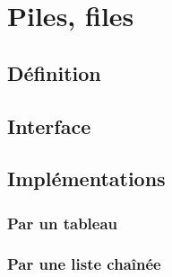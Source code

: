 \documentclass[svgnames,11pt]{beamer}
\begin{document}
\section{Piles, files}
\subsection{Définition}
\subsection{Interface}
\subsection{Implémentations}
\subsubsection{Par un tableau}
\subsubsection{Par une liste chaînée}
\end{document}
